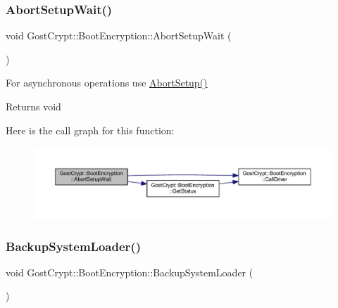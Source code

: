 \subsubsection{\texorpdfstring{Abort\+Setup\+Wait()}{AbortSetupWait()}}
{\footnotesize\ttfamily void Gost\+Crypt\+::\+Boot\+Encryption\+::\+Abort\+Setup\+Wait (\begin{DoxyParamCaption}{ }\end{DoxyParamCaption})}



For asynchronous operations use \hyperlink{class_gost_crypt_1_1_boot_encryption_a8396cfba92f8b27ed9456e08ddb7be2b}{Abort\+Setup()} 

\begin{DoxyReturn}{Returns}
void 
\end{DoxyReturn}
Here is the call graph for this function\+:
\nopagebreak
\begin{figure}[H]
\begin{center}
\leavevmode
\includegraphics[width=350pt]{class_gost_crypt_1_1_boot_encryption_a43e9a83c907891f63e2f5b2a891471be_cgraph}
\end{center}
\end{figure}
\mbox{\label{class_gost_crypt_1_1_boot_encryption_a056b478fceb4e43f9492b9af91cc22c9}} 
\subsubsection{\texorpdfstring{Backup\+System\+Loader()}{BackupSystemLoader()}}
{\footnotesize\ttfamily void Gost\+Crypt\+::\+Boot\+Encryption\+::\+Backup\+System\+Loader (\begin{DoxyParamCaption}{ }\end{DoxyParamCaption})\hspace{0.3cm}{\ttfamily [protected]}}




